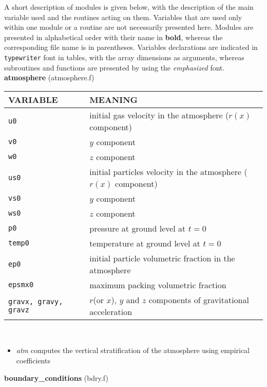 A short description of modules is given below, with the description of the main 
variable used and the routines acting on them. Variables that are used only within one
module or a routine are not necessarily presented here.
Modules are presented in alphabetical order with their name in {\bf bold}, whereas the corresponding
file name is in parentheses. 
Variables declarations are indicated in {\tt typewriter} font in tables, 
with the array dimensions as arguments, whereas subroutines and functions
are presented by using the {\em emphasized} font.\\[5mm]
%
%
{\large {\bf atmosphere}} (atmosphere.f)\\[5mm]
\begin{tabular}{|p{6cm}|p{6cm}|} \hline
VARIABLE & MEANING\\\hline
\tt u0         & initial gas velocity in the atmosphere ($r(x)$ component)\\\hline
\tt v0         & $y$ component\\\hline
\tt w0         & $z$ component\\\hline
\tt us0        & initial particles velocity in the atmosphere ($r(x)$ component)\\ \hline
\tt vs0        & $y$ component\\\hline
\tt ws0        & $z$ component\\\hline
\tt p0         & pressure at ground level at $t=0$\\ \hline
\tt temp0      & temperature at ground level at $t=0$\\ \hline
\tt ep0        & initial particle volumetric fraction in the atmosphere\\\hline
\tt epsmx0     & maximum packing volumetric fraction \\\hline
\tt gravx, gravy, gravz & $r$(or $x$), $y$ and $z$ components of gravitational acceleration\\ \hline
\end{tabular}\\

\begin{itemize}
\item {\em atm} computes the vertical stratification of the atmosphere using 
 empirical coefficients
\end{itemize}
%
%
{\large {\bf boundary\_conditions}} (bdry.f)\\

